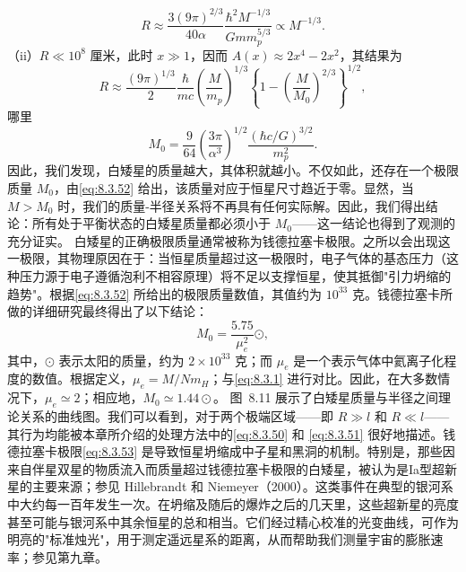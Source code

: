 \begin{equation}\tag{8.3.50}\label{eq:8.3.50}
R \approx \frac { 3 ( 9 \pi ) ^{2 / 3} } { 40 \alpha } \frac { \hbar ^{2} M ^{- 1 / 3} } { G m m _ { p } ^{5 / 3} } \propto M ^{- 1 / 3} .
\end{equation}
（ii）\(R \ll 10^{8}\) 厘米，此时 \(x \gg 1\)，因而 \(A(x) \approx 2x^{4} - 2x^{2}\)，其结果为
\begin{equation}\tag{8.3.51}\label{eq:8.3.51}
R \approx \frac { ( 9 \pi ) ^{1 / 3} } { 2 } \frac { \hbar } { m c } \left( \frac { M } { m _ { p } } \right) ^{1 / 3} \left\{ 1 - \left( \frac { M } { M _ { 0 } } \right) ^{2 / 3} \right\} ^{1 / 2} ,
\end{equation}
哪里
\begin{equation}\tag{8.3.52}\label{eq:8.3.52}
M _ { 0 } = \frac { 9 } { 64 } \left( \frac { 3 \pi } { \alpha ^{3} } \right) ^{1 / 2} \frac { ( \hbar c / G ) ^{3 / 2} } { m _ { p } ^{2} } .
\end{equation}
因此，我们发现，白矮星的质量越大，其体积就越小。不仅如此，还存在一个极限质量 \(M_{0}\)，由\autoref{eq:8.3.52} 给出，该质量对应于恒星尺寸趋近于零。显然，当 \(M > M_{0}\) 时，我们的质量-半径关系将不再具有任何实际解。因此，我们得出结论：所有处于平衡状态的白矮星质量都必须小于 \(M_{0}\)——这一结论也得到了观测的充分证实。
白矮星的正确极限质量通常被称为钱德拉塞卡极限。之所以会出现这一极限，其物理原因在于：当恒星质量超过这一极限时，电子气体的基态压力（这种压力源于电子遵循泡利不相容原理）将不足以支撑恒星，使其抵御"引力坍缩的趋势"。根据\autoref{eq:8.3.52} 所给出的极限质量数值，其值约为 \(10^{33}\) 克。钱德拉塞卡所做的详细研究最终得出了以下结论：
\begin{equation}\tag{8.3.53}\label{eq:8.3.53}
M _ { 0 } = \frac { 5 . 75 } { \mu _ { e } ^{2} } \odot ,
\end{equation}
其中，\(\odot\) 表示太阳的质量，约为 \(2 \times 10^{33}\) 克；而 \(\mu_{e}\) 是一个表示气体中氦离子化程度的数值。根据定义，\(\mu_{e} = M / N m_{H}\)；与\autoref{eq:8.3.1} 进行对比。因此，在大多数情况下，\(\mu_{e} \simeq 2\)；相应地，\(M_{0} \simeq 1.44 \odot\)。
图~8.11 展示了白矮星质量与半径之间理论关系的曲线图。我们可以看到，对于两个极端区域——即 \(R \gg l\) 和 \(R \ll l\)——其行为均能被本章所介绍的处理方法中的\autoref{eq:8.3.50} 和 \autoref{eq:8.3.51} 很好地描述。钱德拉塞卡极限\autoref{eq:8.3.53} 是导致恒星坍缩成中子星和黑洞的机制。特别是，那些因来自伴星双星的物质流入而质量超过钱德拉塞卡极限的白矮星，被认为是Ia型超新星的主要来源；参见 Hillebrandt 和 Niemeyer（2000）。这类事件在典型的银河系中大约每一百年发生一次。在坍缩及随后的爆炸之后的几天里，这些超新星的亮度甚至可能与银河系中其余恒星的总和相当。它们经过精心校准的光变曲线，可作为明亮的"标准烛光"，用于测定遥远星系的距离，从而帮助我们测量宇宙的膨胀速率；参见第九章。
